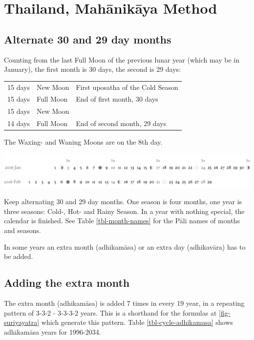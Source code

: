 \documentclass[11pt,oneside]{memoir-article}
\begin{document}
\clearpage

\chapter{Thailand, Mahānikāya Method}
\label{sec-1}
\section{Alternate 30 and 29 day months}
\label{sec-1-1}

Counting from the last Full Moon of the previous lunar year (which may
be in January), the first month is 30 days, the second is 29 days:

\begin{center}
\begin{tabular}{lll}
15 days & \GaNewmoon{} New Moon & First uposatha of the Cold Season\\
15 days & \GaFullmoon{} Full Moon & End of first month, 30 days\\
15 days & \GaNewmoon{} New Moon & \\
14 days & \GaFullmoon{} Full Moon & End of second month, 29 days\\
\end{tabular}
\end{center}

The \GaWaxingmoon{} Waxing- and \GaWaningmoon{} Waning Moons are on the 8th day.

\includegraphics[width=\linewidth]{two-months.pdf}

Keep alternating 30 and 29 day months. One season is four months, one
year is three seasons: Cold-, Hot- and Rainy Season. In a year with
nothing special, the calendar is finished. See Table \ref{tbl-month-names}
for the Pāli names of months and seasons.

In some years an extra month (adhikamāsa) or an extra day
(adhikavāra) has to be added.

\section{Adding the extra month}
\label{sec-1-2}

The extra month (adhikamāsa) is added 7 times in every 19 year, in a repeating
pattern of 3-3-2 - 3-3-3-2 years. This is a shorthand for the formulas
at \ref{fig-suriyayatra} which generate this pattern. Table
\ref{tbl-cycle-adhikamasa} shows adhikamāsa years for 1996-2034.
\end{document}
